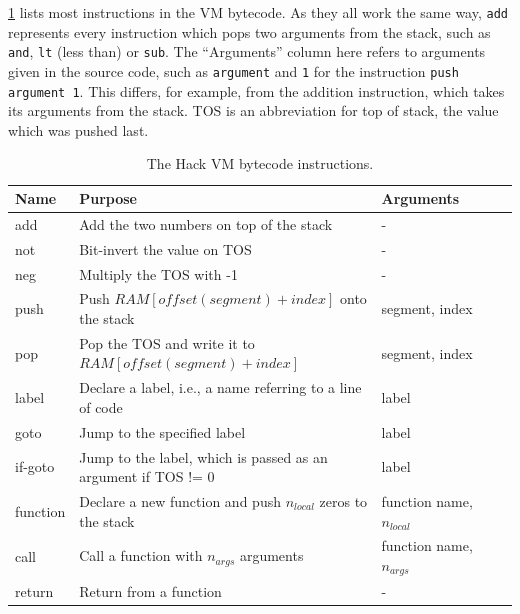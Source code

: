 \cref{table:vm-instructions} lists most instructions in the VM bytecode.
As they all work the same way, \verb+add+ represents every instruction which pops two arguments from the stack, such as \verb+and+, \verb+lt+ (less than) or \verb+sub+.
The ``Arguments'' column here refers to arguments given in the source code, such as \verb+argument+ and \verb+1+ for the instruction \verb+push argument 1+.
This differs, for example, from the addition instruction, which takes its arguments from the stack.
TOS is an abbreviation for top of stack, the value which was pushed last.

\begin{table}[h]
  \begin{center}
    \centering
    \begin{tabular}{@{}lllll@{}}
      \toprule
      Name     & Purpose                                                        & Arguments \\
      \midrule
      add      & Add the two numbers on top of the stack                        & - \\
      not      & Bit-invert the value on TOS                                    & - \\
      neg      & Multiply the TOS with -1                                       & - \\
      push     & Push \(RAM[offset(segment)+index]\) onto the stack             & segment, index \\
      pop      & Pop the TOS and write it to \(RAM[offset(segment)+index]\)     & segment, index \\
      label    & Declare a label, i.e., a name referring to a line of code       & label \\
      goto     & Jump to the specified label                                    & label \\
      if-goto  & Jump to the label, which is passed as an argument if TOS != 0  & label \\
      function & Declare a new function and push \(n_{local}\) zeros to the stack & function name, \(n_{local}\) \\
      call     & Call a function with \(n_{args}\) arguments                     & function name, \(n_{args}\) \\
      return   & Return from a function                                         &         - \\
      \bottomrule
    \end{tabular}
    \caption{The Hack VM bytecode instructions.}
    \label{table:vm-instructions}
  \end{center}
\end{table}


